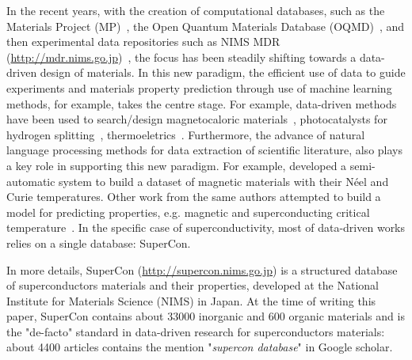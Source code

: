 \documentclass{article}
\begin{document}

In the recent years, with the creation of computational databases, such as the Materials Project (MP)~\cite{materialsprojectJain2013}, the Open Quantum Materials Database (OQMD)~\cite{oqmdkirklin2015open}, and then experimental data repositories such as NIMS MDR (\url{http://mdr.nims.go.jp})~\cite{ranganathan_anusha_2019_3553963}, the focus has been steadily shifting towards a data-driven design of materials. In this new paradigm, the efficient use of data to guide experiments and materials property prediction through use of machine learning methods, for example, takes the centre stage. 
For example, data-driven methods have been used to search/design magnetocaloric materials~\cite{Bocarsly2017,Castro2020,court2021inverse}, photocatalysts for hydrogen splitting~\cite{xiong2021optimizing}, thermoeletrics~\cite{iwasaki2019machine}. Furthermore, the advance of natural language processing methods for data extraction of scientific literature, also plays a key role in supporting this new paradigm. For example, \cite{court2018auto} developed a semi-automatic system to build a dataset of magnetic materials with their Néel and Curie temperatures.  
Other work from the same authors attempted to build a model for predicting properties, e.g. magnetic and superconducting critical temperature~\cite{court_magnetic_2020}. In the specific case of superconductivity, most of data-driven works relies on a single database: SuperCon\cite{stanev_machine_2017, le2020critical,Hamlin2019SuperconductivityNR}.


In more details, SuperCon (\url{http://supercon.nims.go.jp}) is a structured database of superconductors materials and their properties, developed at the National Institute for Materials Science (NIMS) in Japan. 
At the time of writing this paper, SuperCon contains about 33000 inorganic and 600 organic materials and is the "de-facto" standard in data-driven research for superconductors materials: about 4400 articles contains the mention "\textit{supercon database}" in Google scholar. 
\end{document}
